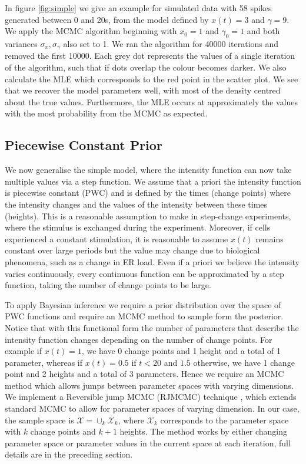 \documentclass[../main.tex]{subfiles}
\begin{document}
In figure \ref{fig:simple} we give an example for simulated data with 58 spikes generated between 0 and 20s, from the model defined by $x(t) = 3$ and $\gamma = 9$.  We apply the MCMC algorithm beginning with $x_0 = 1$ and $\gamma_0 = 1$ and both variances $\sigma_x, \sigma_\gamma$ also set to 1. We ran the algorithm for 40000 iterations and removed the first 10000. Each grey dot represents the values of a single iteration of the algorithm, such that if dots overlap the colour becomes darker. We also calculate the MLE which corresponds to the red point in the scatter plot. We see that we recover the model parameters well, with most of the density centred about the true values. Furthermore, the MLE occurs at approximately the values with the most probability from the MCMC as expected.
 
 \subsection{Piecewise Constant Prior }
 We now generalise the simple model, where the intensity function can now take multiple values via a step function. We assume that a priori the intensity function is piecewise constant (PWC) and is defined by the times (change points) where the intensity changes and the values of the intensity between these times (heights). This is a reasonable assumption to make in step-change experiments, where the stimulus is exchanged during the experiment. Moreover, if cells experienced a constant stimulation, it is reasonable to assume $x(t)$ remains constant over large periods but the value may change due to biological phenomena, such as a change in ER  load. Even if a priori we believe the intensity varies continuously, every continuous function can be approximated by a step function, taking the number of change points to be large.
  
To apply Bayesian inference we require a prior distribution over the space of PWC functions and require an MCMC method to sample form the posterior. Notice that with this functional form the number of parameters that describe the intensity function changes depending on the number of change points. For example if $x(t) = 1$, we have 0 change points and 1 height and a total of 1 parameter, whereas if $x(t) = 0.5$ if $t<20$ and $1.5$ otherwise, we have 1 change point and 2 heights and a total of 3 parameters. Hence we require an MCMC method which allows jumps between parameter spaces with varying dimensions. We implement a Reversible jump MCMC (RJMCMC) technique \cite{RJMCMC}, which extends standard MCMC to allow for parameter spaces of varying dimension. In our case, the sample space is $\mathcal{X} = \cup_k \mathcal{X}_k$, where $\mathcal{X}_k$ corresponds to the parameter space with $k$ change points and $k+1$ heights. The method works by either changing parameter space or parameter values in the current space at each iteration, full details are in the preceding section.  
 
\end{document}
